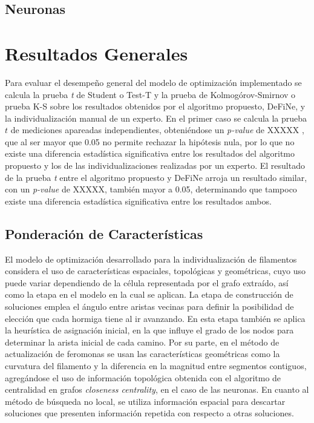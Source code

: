 \clearpage
\newpage

\subsection{Neuronas}

\section{Resultados Generales}
Para evaluar el desempe\~no general del modelo de optimizaci\'on implementado se calcula la prueba {\it t} de Student o Test-T y la prueba de Kolmog\'orov-Smirnov o prueba K-S sobre los resultados obtenidos por el algoritmo propuesto, DeFiNe, y la individualizaci\'on manual de un experto. En el primer caso se calcula la prueba $t$ de mediciones apareadas independientes, obteni\'endose un {\it p-value} de XXXXX , que al ser mayor que 0.05 no permite rechazar la hip\'otesis nula, por lo que no existe una diferencia estad\'istica significativa entre los resultados del algoritmo propuesto y los de las individualizaciones realizadas por un experto. El resultado de la prueba {\it t} entre el algoritmo propuesto y DeFiNe arroja un resultado similar, con un {\it p-value} de XXXXX, tambi\'en mayor a 0.05, determinando que tampoco existe una diferencia estad\'istica significativa entre los resultados ambos.


\subsection{Ponderaci\'on de Caracter\'isticas}
\label{subsec:ponderacion}
El modelo de optimizaci\'on desarrollado para la individualizaci\'on de filamentos considera el uso de caracter\'isticas espaciales, topol\'ogicas y geom\'etricas, cuyo uso puede variar dependiendo de la c\'elula representada por el grafo extra\'ido, as\'i como la etapa en el modelo en la cual se aplican. La etapa de construcci\'on de soluciones emplea el \'angulo entre aristas vecinas para definir la posibilidad de elecci\'on que cada hormiga tiene al ir avanzando. En esta etapa tambi\'en se aplica la heur\'istica de asignaci\'on inicial, en la que influye el grado de los nodos para determinar la arista inicial de cada camino. Por su parte, en el m\'etodo de actualizaci\'on de feromonas se usan las caracter\'isticas geom\'etricas como la curvatura del filamento y la diferencia en la magnitud entre segmentos contiguos, agreg\'andose el uso de informaci\'on topol\'ogica obtenida con el algoritmo de centralidad en grafos {\it closeness centrality}, en el caso de las neuronas. En cuanto al m\'etodo de b\'usqueda no local, se utiliza informaci\'on espacial para descartar soluciones que presenten informaci\'on repetida con respecto a otras soluciones.


